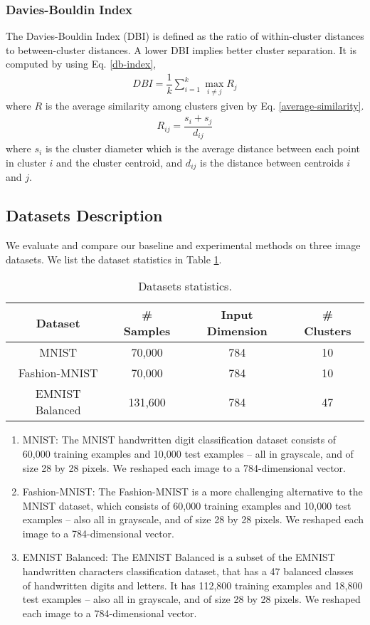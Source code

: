 \documentclass[conference]{IEEEtran}
\begin{document}
\subsubsection{Davies-Bouldin Index} The Davies-Bouldin Index (DBI) is defined as the ratio of within-cluster distances to between-cluster distances\cite{davies1979cluster, halkidi2001clustering}. A lower DBI implies better cluster separation. It is computed by using Eq. \ref{db-index},
\begin{align}\label{db-index}
    DBI = \dfrac{1}{k} \sum_{i=1}^{k} \max_{i \neq j} R_{j}
\end{align}
\indent where $R$ is the average similarity among clusters given by Eq. \ref{average-similarity}.
\begin{align}\label{average-similarity}
    R_{ij} = \dfrac{s_{i} + s_{j}}{d_{ij}}
\end{align}
\indent where $s_{i}$ is the cluster diameter which is the average distance between each point in cluster $i$ and the cluster centroid, and $d_{ij}$ is the distance between centroids $i$ and $j$.

\subsection{Datasets Description}
We evaluate and compare our baseline and experimental methods on three image datasets. We list the dataset statistics in Table \ref{tab:data_stats}.
\begin{table}[htb]
    \caption{Datasets statistics.}
    \label{tab:data_stats}
    \centering
    \begin{tabular}{c|c|c|c}
        \hline
         Dataset & \# Samples & Input Dimension & \# Clusters\\
        \hline
         MNIST &  70,000 & 784 & 10\\
         Fashion-MNIST & 70,000 & 784 & 10\\
         EMNIST Balanced & 131,600 & 784 & 47\\
        \hline
    \end{tabular}
\end{table}
\begin{enumerate}
    \item MNIST: The MNIST handwritten digit classification dataset\cite{lecun1998gradient} consists of 60,000 training examples and 10,000 test examples -- all in grayscale, and of size 28 by 28 pixels. We reshaped each image to a 784-dimensional vector.
    \item Fashion-MNIST: The Fashion-MNIST\cite{xiao2017fashion} is a more challenging alternative to the MNIST dataset, which consists of 60,000 training examples and 10,000 test examples -- also all in grayscale, and of size 28 by 28 pixels. We reshaped each image to a 784-dimensional vector.
    \item EMNIST Balanced: The EMNIST Balanced is a subset of the EMNIST handwritten characters classification dataset\cite{cohen2017emnist}, that has a 47 balanced classes of handwritten digits and letters. It has 112,800 training examples and 18,800 test examples -- also all in grayscale, and of size 28 by  28 pixels. We reshaped each image to a 784-dimensional vector.
\end{enumerate}
\end{document}
